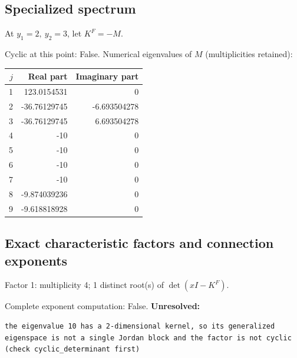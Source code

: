 \documentclass[10pt,a4paper]{article}
\newcommand{\fitmath}[1]{\sbox{\mathbox}{$\displaystyle #1$}\ifdim\wd\mathbox>\linewidth\resizebox{\linewidth}{!}{\usebox{\mathbox}}\else\usebox{\mathbox}\fi}
\begin{document}
\subsection*{Specialized spectrum}
At $y_1=2,\ y_2=3$, let $K^F=-M$.
\begin{center}\fitmath{\Delta=0}\end{center}
Cyclic at this point: False.
Numerical eigenvalues of $M$ (multiplicities retained):
\begin{center}\small\begin{tabular}{rrr}\toprule $j$ & Real part & Imaginary part\\\midrule
1 & 123.0154531 & 0\\
2 & -36.76129745 & -6.693504278\\
3 & -36.76129745 & 6.693504278\\
4 & -10 & 0\\
5 & -10 & 0\\
6 & -10 & 0\\
7 & -10 & 0\\
8 & -9.874039236 & 0\\
9 & -9.618818928 & 0\\
\bottomrule\end{tabular}\end{center}
\subsection*{Exact characteristic factors and connection exponents}
Factor 1: multiplicity 4; 1 distinct root(s) of $\det(xI-K^F)$.
\begin{center}\fitmath{\begin{aligned}p_{1}(x)&=x - 10\end{aligned}}\end{center}
Complete exponent computation: False.
\textbf{Unresolved:}

\begin{lstlisting}
the eigenvalue 10 has a 2-dimensional kernel, so its generalized eigenspace is not a single Jordan block and the factor is not cyclic (check cyclic_determinant first)
\end{lstlisting}
\end{document}
